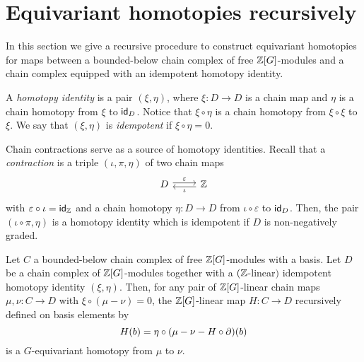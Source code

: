 
\section{Equivariant homotopies recursively}\label{s:equivariant homotopy general}

In this section we give a recursive procedure to construct equivariant homotopies for maps between a bounded-below chain complex of free $\mathbb{Z}[G]$-modules and a chain complex equipped with an idempotent homotopy identity.

\begin{definition*}
	A \textit{homotopy identity} is a pair $(\xi,\eta)$, where $\xi \colon D \to D$ is a chain map and $\eta$ is a chain homotopy from $\xi$ to $\mathsf{id}_D$.
	Notice that $\xi \circ \eta$ is a chain homotopy from $\xi \circ \xi$ to $\xi$.
	We say that $(\xi, \eta)$ is \textit{idempotent} if $\xi \circ \eta = 0$.
\end{definition*}

\begin{example*}
	Chain contractions serve as a source of homotopy identities.
	Recall that a \textit{contraction} is a triple $(\iota,\pi,\eta)$ of two chain maps
	\[
	\begin{tikzcd}
		D \arrow[r,"\varepsilon", shift left=2pt] & \Z \arrow[l, "\iota", shift left=2pt]
	\end{tikzcd}
	\]
	with $\varepsilon\circ\iota = \mathsf{id}_{\mathbb{Z}}$ and a chain homotopy $\eta \colon D \to D$ from $\iota\circ\varepsilon$ to $\mathsf{id}_D$.
	Then, the pair $(\iota \circ \pi, \eta)$ is a homotopy identity which is idempotent if $D$ is non-negatively graded.
\end{example*}

\begin{theorem}\label{t:recursive construction}
	Let $C$ a bounded-below chain complex of free $\mathbb{Z}[G]$-modules with a basis.
	Let $D$ be a chain complex of $\mathbb{Z}[G]$-modules together with a $(\mathbb{Z}$-linear$)$ idempotent homotopy identity $(\xi, \eta)$.
	Then, for any pair of $\mathbb{Z}[G]$-linear chain maps $\mu,\nu \colon C \to D$ with $\xi \circ (\mu -\nu) = 0$, the $\mathbb{Z}[G]$-linear map $H \colon C \to D$ recursively defined on basis elements by
	\begin{equation}\label{eq:lemma def}
		H(b) = \eta \circ (\mu - \nu - H \circ \operatorname{\partial})(b)
	\end{equation}
	is a $G$-equivariant homotopy from $\mu$ to $\nu$.
\end{theorem}

